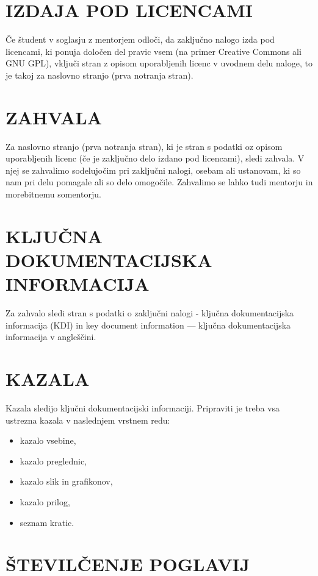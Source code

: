 \section{IZDAJA POD LICENCAMI}

Če študent v soglasju z mentorjem odloči, da zaključno nalogo izda pod licencami, ki ponuja določen del pravic vsem (na primer Creative Commons ali GNU GPL), vključi stran z opisom uporabljenih licenc v uvodnem delu naloge, to je takoj za naslovno stranjo (prva notranja stran).

\section{ZAHVALA}

Za naslovno stranjo (prva notranja stran), ki je stran s podatki oz opisom uporabljenih licenc (če je zaključno delo izdano pod licencami), sledi zahvala. V njej se zahvalimo sodelujočim pri zaključni nalogi, osebam ali ustanovam, ki so nam pri delu pomagale ali so delo omogočile. Zahvalimo se lahko tudi mentorju in morebitnemu somentorju.

\section{KLJUČNA DOKUMENTACIJSKA INFORMACIJA}

Za zahvalo sledi stran s podatki o zaključni nalogi - ključna dokumentacijska informacija (KDI) in key document information — ključna dokumentacijska informacija v angleščini.

\section{KAZALA}

Kazala sledijo ključni dokumentacijski informaciji.
Pripraviti je treba vsa ustrezna kazala v naslednjem vrstnem redu:

\begin{itemize}
\item kazalo vsebine,
\item kazalo preglednic,
\item kazalo slik in grafikonov,
\item kazalo prilog,
\item seznam kratic.
\end{itemize}

\section{ŠTEVILČENJE POGLAVIJ}

